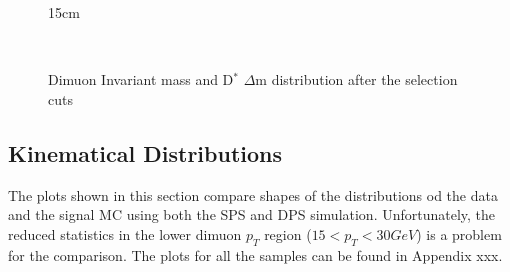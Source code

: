 \begin{figure}[!htm]{15cm}
  \caption{Dimuon Invariant mass and D$^*$ $\Delta$m distribution after the selection cuts}
  \label{fig:invmass_selection}
  \hfill
  \\
\end{figure}

\subsection{Kinematical Distributions}

The plots shown in this section compare shapes of the distributions od the data and the signal MC using both the SPS and DPS simulation. Unfortunately, the reduced statistics in the lower dimuon $p_T$ region ($15 < p_T < 30 GeV$) is a problem for the comparison. The plots for all the samples can be found in Appendix xxx.

